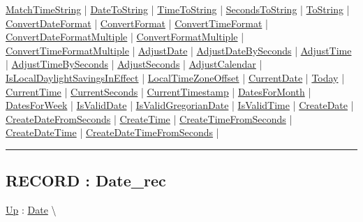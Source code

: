 \hyperlink{ecldoc:date.matchtimestring}{MatchTimeString}  |
\hyperlink{ecldoc:date.datetostring}{DateToString}  |
\hyperlink{ecldoc:date.timetostring}{TimeToString}  |
\hyperlink{ecldoc:date.secondstostring}{SecondsToString}  |
\hyperlink{ecldoc:date.tostring}{ToString}  |
\hyperlink{ecldoc:date.convertdateformat}{ConvertDateFormat}  |
\hyperlink{ecldoc:date.convertformat}{ConvertFormat}  |
\hyperlink{ecldoc:date.converttimeformat}{ConvertTimeFormat}  |
\hyperlink{ecldoc:date.convertdateformatmultiple}{ConvertDateFormatMultiple}  |
\hyperlink{ecldoc:date.convertformatmultiple}{ConvertFormatMultiple}  |
\hyperlink{ecldoc:date.converttimeformatmultiple}{ConvertTimeFormatMultiple}  |
\hyperlink{ecldoc:date.adjustdate}{AdjustDate}  |
\hyperlink{ecldoc:date.adjustdatebyseconds}{AdjustDateBySeconds}  |
\hyperlink{ecldoc:date.adjusttime}{AdjustTime}  |
\hyperlink{ecldoc:date.adjusttimebyseconds}{AdjustTimeBySeconds}  |
\hyperlink{ecldoc:date.adjustseconds}{AdjustSeconds}  |
\hyperlink{ecldoc:date.adjustcalendar}{AdjustCalendar}  |
\hyperlink{ecldoc:date.islocaldaylightsavingsineffect}{IsLocalDaylightSavingsInEffect}  |
\hyperlink{ecldoc:date.localtimezoneoffset}{LocalTimeZoneOffset}  |
\hyperlink{ecldoc:date.currentdate}{CurrentDate}  |
\hyperlink{ecldoc:date.today}{Today}  |
\hyperlink{ecldoc:date.currenttime}{CurrentTime}  |
\hyperlink{ecldoc:date.currentseconds}{CurrentSeconds}  |
\hyperlink{ecldoc:date.currenttimestamp}{CurrentTimestamp}  |
\hyperlink{ecldoc:date.datesformonth}{DatesForMonth}  |
\hyperlink{ecldoc:date.datesforweek}{DatesForWeek}  |
\hyperlink{ecldoc:date.isvaliddate}{IsValidDate}  |
\hyperlink{ecldoc:date.isvalidgregoriandate}{IsValidGregorianDate}  |
\hyperlink{ecldoc:date.isvalidtime}{IsValidTime}  |
\hyperlink{ecldoc:date.createdate}{CreateDate}  |
\hyperlink{ecldoc:date.createdatefromseconds}{CreateDateFromSeconds}  |
\hyperlink{ecldoc:date.createtime}{CreateTime}  |
\hyperlink{ecldoc:date.createtimefromseconds}{CreateTimeFromSeconds}  |
\hyperlink{ecldoc:date.createdatetime}{CreateDateTime}  |
\hyperlink{ecldoc:date.createdatetimefromseconds}{CreateDateTimeFromSeconds}  |

\rule{\linewidth}{0.5pt}

\subsection*{RECORD : Date\_rec}
\hypertarget{ecldoc:date.date_rec}{}
\hyperlink{ecldoc:Date}{Up} :
\hspace{0pt} \hyperlink{ecldoc:Date}{Date} \textbackslash 

